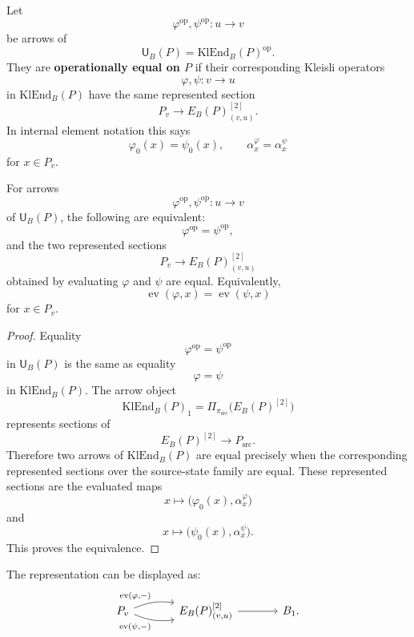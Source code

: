 \begin{definition}
Let
\[
        \varphi^{\operatorname{op}},\psi^{\operatorname{op}}:u\longrightarrow v
\]
be arrows of
\[
        \mathsf U_B(P)=\mathrm{KlEnd}_B(P)^{\operatorname{op}}.
\]
They are \textbf{operationally equal on \(P\)} if their corresponding Kleisli operators
\[
        \varphi,\psi:v\longrightarrow u
\]
in \(\mathrm{KlEnd}_B(P)\) have the same represented section
\[
        P_v\longrightarrow E_B(P)^{[2]}_{(v,u)}.
\]
In internal element notation this says
\[
        \varphi_0(x)=\psi_0(x),
        \qquad
        \alpha_x^\varphi=\alpha_x^\psi
\]
for \(x\in P_v\).
\end{definition}

\begin{theorem}
\label{thm:operational-full-abstraction}
For arrows
\[
        \varphi^{\operatorname{op}},\psi^{\operatorname{op}}:u\longrightarrow v
\]
of \(\mathsf U_B(P)\), the following are equivalent:
\[
        \varphi^{\operatorname{op}}=\psi^{\operatorname{op}},
\]
and the two represented sections
\[
        P_v\longrightarrow E_B(P)^{[2]}_{(v,u)}
\]
obtained by evaluating \(\varphi\) and \(\psi\) are equal.  Equivalently,
\[
        \operatorname{ev}(\varphi,x)=\operatorname{ev}(\psi,x)
\]
for \(x\in P_v\).
\end{theorem}

\begin{proof}
Equality
\[
        \varphi^{\operatorname{op}}=\psi^{\operatorname{op}}
\]
in \(\mathsf U_B(P)\) is the same as equality
\[
        \varphi=\psi
\]
in \(\mathrm{KlEnd}_B(P)\).  The arrow object
\[
        \mathrm{KlEnd}_B(P)_1
        =
        \Pi_{\pi_{\mathrm{src}}}\bigl(E_B(P)^{[2]}\bigr)
\]
represents sections of
\[
        E_B(P)^{[2]}\to P_{\mathrm{src}}.
\]
Therefore two arrows of \(\mathrm{KlEnd}_B(P)\) are equal precisely when the corresponding
represented sections over the source-state family are equal.  These represented sections are the
evaluated maps
\[
        x\longmapsto
        \bigl(\varphi_0(x),\alpha_x^\varphi\bigr)
\]
and
\[
        x\longmapsto
        \bigl(\psi_0(x),\alpha_x^\psi\bigr).
\]
This proves the equivalence.
\end{proof}

The representation can be displayed as:
\[
\begin{tikzcd}[column sep=large,row sep=large]
P_v
\ar[r,bend left=15,"{\operatorname{ev}(\varphi,-)}"]
\ar[r,bend right=15,swap,"{\operatorname{ev}(\psi,-)}"]
&
E_B(P)^{[2]}_{(v,u)}
\ar[r]
&
B_1 .
\end{tikzcd}
\]

